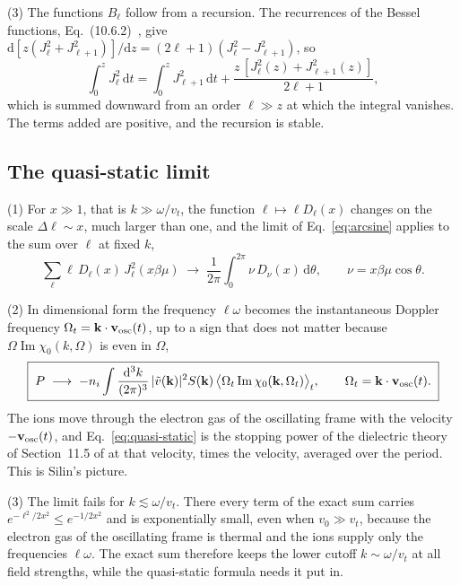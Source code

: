 \documentclass[11pt]{article}
\numberwithin{equation}{section}
\newcommand{\kv}{\mathbf k}
\newcommand{\vosc}{\mathbf v_{\rm osc}}
\newcommand{\dd}{\mathrm d}
\DeclareMathOperator{\Imag}{Im}
\begin{document}
{\noindent}(3) The functions $B_\ell$ follow from a recursion. The recurrences
of the Bessel functions, Eq.~(10.6.2)~\cite{DLMF}, give
$\dd[z(J_\ell^2+J_{\ell+1}^2)]/\dd z=(2\ell+1)(J_\ell^2-J_{\ell+1}^2)$, so
\begin{equation}
\int_0^zJ_\ell^2\,\dd t=\int_0^zJ_{\ell+1}^2\,\dd t+\frac{z\,[J_\ell^2(z)+J_{\ell+1}^2(z)]}{2\ell+1},
\label{eq:Bl-recursion}
\end{equation}
which is summed downward from an order $\ell\gg z$ at which the integral
vanishes. The terms added are positive, and the recursion is stable.

\subsection{The quasi-static limit}
{\noindent}(1) For $x\gg1$, that is $k\gg\omega/v_t$, the function
$\ell\mapsto\ell D_\ell(x)$ changes on the scale $\Delta\ell\sim x$, much larger than
one, and the limit of Eq.~\eqref{eq:arcsine} applies to the sum over $\ell$ at
fixed $k$,
\begin{equation}
\sum_\ell\ell\,D_\ell(x)\,J_\ell^2(x\beta\mu)\;\longrightarrow\;
\frac{1}{2\pi}\int_0^{2\pi}\nu\,D_\nu(x)\,\dd\theta,\qquad \nu=x\beta\mu\cos\theta.
\end{equation}

{\noindent}(2) In dimensional form the frequency $\ell\omega$ becomes the
instantaneous Doppler frequency $\Omega_t=\kv\cdot\vosc(t)$, up to a sign that
does not matter because $\Omega\Imag\chi_0(k,\Omega)$ is even in $\Omega$,
\begin{equation}
\boxed{\;P\;\longrightarrow\;-n_i\int\frac{\dd^3k}{(2\pi)^3}\,|\tilde v(\kv)|^2S(\kv)\,
\big\langle\Omega_t\Imag\chi_0(\kv,\Omega_t)\big\rangle_t,\qquad\Omega_t=\kv\cdot\vosc(t).\;}
\label{eq:quasi-static}
\end{equation}
The ions move through the electron gas of the oscillating frame with the
velocity $-\vosc(t)$, and Eq.~\eqref{eq:quasi-static} is the stopping power of
the dielectric theory of Section~11.5 of \cite{Atzeni2004} at that velocity,
times the velocity, averaged over the period. This is Silin's picture.

{\noindent}(3) The limit fails for $k\lesssim\omega/v_t$. There every term of the
exact sum carries $e^{-\ell^2/2x^2}\leq e^{-1/2x^2}$ and is exponentially small,
even when $v_0\gg v_t$, because the electron gas of the oscillating frame is
thermal and the ions supply only the frequencies $\ell\omega$. The exact sum
therefore keeps the lower cutoff $k\sim\omega/v_t$ at all field strengths, while
the quasi-static formula needs it put in.
\end{document}
